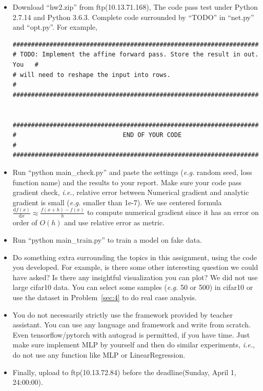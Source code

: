 \documentclass[12pt]{article}
\begin{document}
\begin{itemize}

	\item Download ``hw2.zip'' from ftp(10.13.71.168), The code pass test under Python 2.7.14 and Python 3.6.3. Complete code surrounded by ``TODO'' in ``net.py'' and ``opt.py''. For example,
	      \begin{verbatim}
###########################################################################
# TODO: Implement the affine forward pass. Store the result in out. You   #
# will need to reshape the input into rows.                               #
###########################################################################


###########################################################################
#                             END OF YOUR CODE                            #
###########################################################################
	\end{verbatim}
	\item Run ``python main\_check.py'' and paste the settings (\textit{e.g.} random seed, loss function name) and the results to  your report.  Make sure your code pass gradient check, \textit{i.e.}, relative error between Numerical gradient and analytic gradient is small (\textit{e.g.} smaller than 1e-7). We use centered formula $\displaystyle \frac{\mathrm{d}f(x)}{\mathrm{d}x} \approx \frac{f(x+h)-f(x)}{h}$ to compute numerical gradient since it has an error on order of $O(h)$ and use relative error as metric.
	\item Run ``python main\_train.py'' to train a model on fake data.
	\item Do something extra surrounding the topics in this assignment,  using the code you developed. For example, is there some other interesting question we could have asked? Is there any insightful visualization you can plot? We did not use large cifar10 data. You can select some samples (\textit{e.g.} 50 or 500) in cifar10 or use the dataset in Problem~\ref{sec:4} to do real case analysis.
	\item You do not necessarily strictly use the framework provided by teacher assistant. You can use any language and framework and write from scratch.
	      Even tensorflow/pytorch with autograd is permitted, if you have time.
	      Just make sure implement MLP by yourself and then do similar experiments, \textit{i.e.}, do not use any function like MLP or LinearRegression.
	\item Finally, upload to ftp(10.13.72.84) before the deadline(Sunday, April 1, 24:00:00).
\end{itemize}
\end{document}
